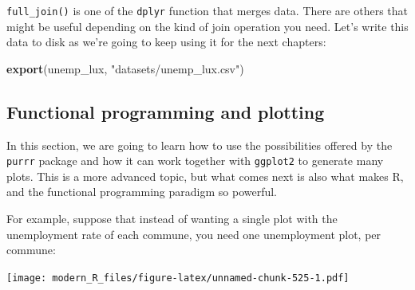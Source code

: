 \documentclass[]{gitbook}
\newenvironment{Shaded}{\begin{snugshade}}{\end{snugshade}}
\newcommand{\DataTypeTok}[1]{\textcolor[rgb]{0.13,0.29,0.53}{#1}}
\newcommand{\KeywordTok}[1]{\textcolor[rgb]{0.13,0.29,0.53}{\textbf{#1}}}
\newcommand{\NormalTok}[1]{#1}
\newcommand{\OperatorTok}[1]{\textcolor[rgb]{0.81,0.36,0.00}{\textbf{#1}}}
\newcommand{\StringTok}[1]{\textcolor[rgb]{0.31,0.60,0.02}{#1}}
\theoremstyle{definition}
\theoremstyle{definition}
\theoremstyle{definition}
\theoremstyle{remark}
\begin{document}
\texttt{full\_join()} is one of the \texttt{dplyr} function that merges
data. There are others that might be useful depending on the kind of
join operation you need. Let's write this data to disk as we're going to
keep using it for the next chapters:

\begin{Shaded}
\begin{Highlighting}[]
\KeywordTok{export}\NormalTok{(unemp_lux, }\StringTok{"datasets/unemp_lux.csv"}\NormalTok{)}
\end{Highlighting}
\end{Shaded}

\hypertarget{functional-programming-and-plotting}{%
\subsection{Functional programming and
plotting}\label{functional-programming-and-plotting}}

In this section, we are going to learn how to use the possibilities
offered by the \texttt{purrr} package and how it can work together with
\texttt{ggplot2} to generate many plots. This is a more advanced topic,
but what comes next is also what makes R, and the functional programming
paradigm so powerful.

For example, suppose that instead of wanting a single plot with the
unemployment rate of each commune, you need one unemployment plot, per
commune:

\begin{Shaded}
\end{Shaded}

\texttt{[image: modern\_R\_files/figure-latex/unnamed-chunk-525-1.pdf]}
\end{document}
